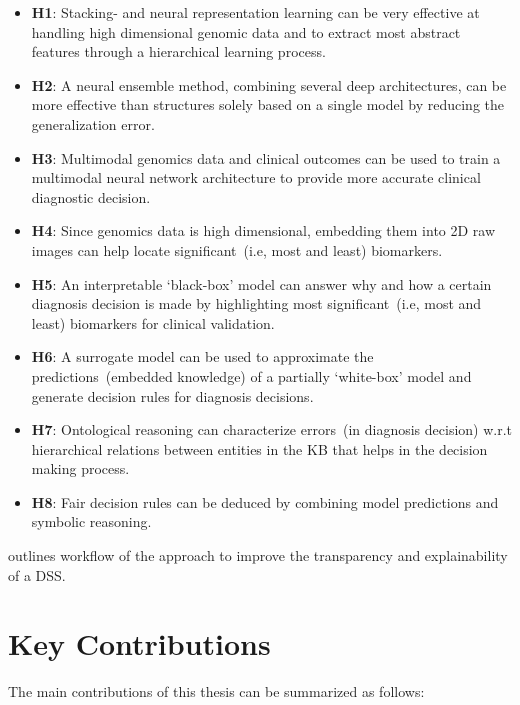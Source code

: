 \begin{itemize}[noitemsep]
    \item \textbf{H1}: Stacking- and neural representation learning can be very effective at handling high dimensional genomic data and to extract most abstract features through a hierarchical learning process. 
    \item \textbf{H2}: A neural ensemble method, combining several deep architectures, can be more effective than structures solely based on a single model by reducing the generalization error. 
	\item \textbf{H3}: Multimodal genomics data and clinical outcomes can be used to train a multimodal neural network architecture to provide more accurate clinical diagnostic decision. 
    \item \textbf{H4}: Since genomics data is high dimensional, embedding them into 2D raw images can help locate significant~(i.e, most and least) biomarkers. 
    \item \textbf{H5}: An interpretable `black-box' model can answer why and how a certain diagnosis decision is made by highlighting most significant~(i.e, most and least) biomarkers for clinical validation. 
    \item \textbf{H6}: A surrogate model can be used to approximate the predictions~(embedded knowledge) of a partially `white-box' model and generate decision rules for diagnosis decisions. 
    \item \textbf{H7}: Ontological reasoning can characterize errors~(in diagnosis decision) w.r.t hierarchical relations between entities in the KB that helps in the decision making process.
    \item \textbf{H8}: Fair decision rules can be deduced by combining model predictions and symbolic reasoning. 
\end{itemize}

\hspace*{3.5mm}  outlines workflow of the  approach to improve the transparency and explainability of a DSS. 

\section{Key Contributions} \label{contributions}
The main contributions of this thesis can be summarized as follows:


